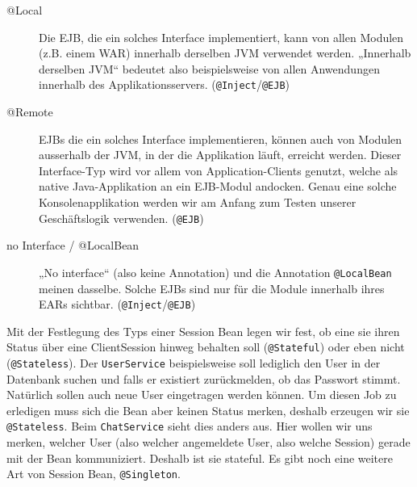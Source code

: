 \begin{description}
	\item[@Local] Die EJB, die ein solches Interface implementiert, kann von allen Modulen (z.B. einem WAR) innerhalb derselben JVM verwendet werden. „Innerhalb derselben JVM“ bedeutet also beispielsweise von allen Anwendungen innerhalb des Applikationsservers. (\verb|@Inject|/\verb|@EJB|)
		
	\item[@Remote] EJBs die ein solches Interface implementieren, können auch von Modulen ausserhalb der JVM, in der die Applikation läuft, erreicht werden. Dieser Interface-Typ wird vor allem von Application-Clients	genutzt, welche als native Java-Applikation an ein EJB-Modul andocken. Genau eine solche Konsolenapplikation werden wir am	Anfang zum Testen unserer Geschäftslogik verwenden. (\verb|@EJB|)
	
	\item[no Interface / @LocalBean] „No interface“ (also keine Annotation) und die Annotation \verb|@LocalBean| meinen dasselbe. Solche EJBs sind nur für die Module innerhalb ihres EARs sichtbar. (\verb|@Inject|/\verb|@EJB|)
\end{description}
 
Mit der Festlegung des Typs einer Session Bean legen wir fest, ob eine sie ihren Status über eine ClientSession hinweg behalten soll (\verb|@Stateful|) oder eben nicht (\verb|@Stateless|). Der \verb|UserService| beispielsweise
soll lediglich den User in der Datenbank suchen und falls er existiert zurückmelden, ob das Passwort stimmt. Natürlich sollen auch neue User eingetragen werden können. Um diesen Job zu erledigen muss
sich die Bean aber keinen Status merken, deshalb erzeugen wir sie \verb|@Stateless|. Beim \verb|ChatService| sieht dies anders aus. Hier wollen wir uns merken, welcher User (also welcher angemeldete User, also welche Session) gerade mit der Bean kommuniziert. Deshalb ist sie stateful. Es gibt noch eine weitere Art von Session Bean, \verb|@Singleton|.

